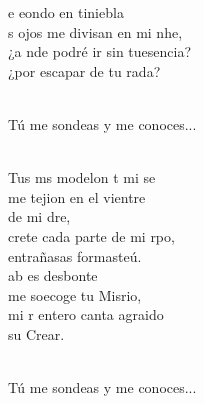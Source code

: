 \begin{cancion}
	e eondo en tiniebla \\
	s ojos me divisan en mi nhe, \\
	¿a nde podré ir sin tuesencia?  \\
	¿por escapar de tu rada?  \\\jump\\
	\begin{chorus}%
Tú me sondeas y me conoces... \\
	\end{chorus}%
	\jump\\
	Tus ms modelon t mi se\\
	me tejion en el vientre\\
	de mi dre, \\
	crete cada parte de mi rpo, \\
	 entrañasas formasteú. \\
	ab es desbonte \\
	me soecoge tu Misrio, \\
	mi r entero canta agraido \\
	 su Crear. \\\jump\\
	\begin{chorus}%
Tú me sondeas y me conoces... \\
	\end{chorus}%
	\jump\\
\end{cancion}%
